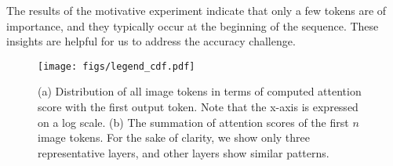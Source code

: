 The results of the motivative experiment indicate that only a few tokens are of importance, and they typically occur at the beginning of the sequence. These insights are helpful for us to address the accuracy challenge.

\begin{figure}[t]
    \centering
    \texttt{[image: figs/legend\_cdf.pdf]}
    \vskip -0.2in
    \caption{(a) Distribution of all image tokens in terms of computed attention score with the first output token. Note that the x-axis is expressed on a log scale. (b) The summation of attention scores of the first $n$ image tokens. For the sake of clarity, we show only three representative layers, and other layers show similar patterns.}
\end{figure}